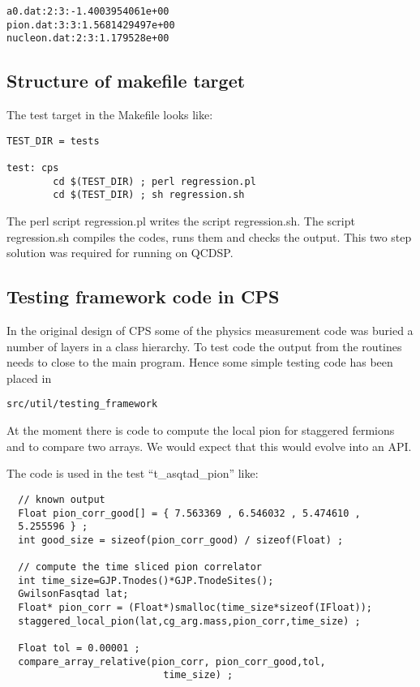 \documentclass[12pt]{article}
\begin{document}
\begin{verbatim}
a0.dat:2:3:-1.4003954061e+00
pion.dat:3:3:1.5681429497e+00
nucleon.dat:2:3:1.179528e+00
\end{verbatim}


\subsection{Structure of makefile target}

The test target in the Makefile looks like:
\begin{verbatim}
TEST_DIR = tests

test: cps
        cd $(TEST_DIR) ; perl regression.pl
        cd $(TEST_DIR) ; sh regression.sh
\end{verbatim}

The perl script regression.pl writes the script 
regression.sh. The script regression.sh compiles the codes,
runs them and checks the output. This two step solution
was required for running on QCDSP.

\subsection{Testing framework code in CPS}

In the original design of CPS some of the physics
measurement code was buried a number of layers 
in a class hierarchy. To test code the output from 
the routines needs to close to the main program.
Hence some simple testing code has been placed 
in
\begin{verbatim}
src/util/testing_framework
\end{verbatim}

At the moment there is code to compute the local pion for staggered
fermions and to compare two arrays. We would expect that this 
would evolve into an API.

The code is used in the test ``t\_asqtad\_pion'' like:

\begin{verbatim}
  // known output
  Float pion_corr_good[] = { 7.563369 , 6.546032 , 5.474610 ,
  5.255596 } ;
  int good_size = sizeof(pion_corr_good) / sizeof(Float) ;

  // compute the time sliced pion correlator
  int time_size=GJP.Tnodes()*GJP.TnodeSites();
  GwilsonFasqtad lat;
  Float* pion_corr = (Float*)smalloc(time_size*sizeof(IFloat));
  staggered_local_pion(lat,cg_arg.mass,pion_corr,time_size) ;

  Float tol = 0.00001 ;
  compare_array_relative(pion_corr, pion_corr_good,tol,
                           time_size) ;
\end{verbatim}
\end{document}
